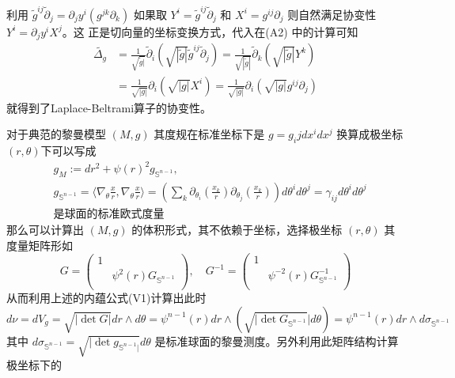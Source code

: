 利用 $\tilde{g}^{ij} \tilde{\partial}_j = \partial_j y^i( g^{jk} {\partial}_k)$ 如果取 
$Y^i = \tilde{g}^{ij} \tilde{\partial}_j $ 和 $X^i = g^{ij}{\partial}_j $ 则自然满足协变性 $Y^i = \partial_j y^i X^j$。这
正是切向量的坐标变换方式，代入在(A2) 中的计算可知
\begin{align*}
    \widetilde{\Delta_g} &= \frac{1}{\sqrt{\tilde{g}|}} \tilde{\partial}_i (\sqrt{|\tilde{g}|}\tilde{g}^{ij}\tilde{\partial}_j ) = \frac{1}{\sqrt{|\tilde{g}|}} \tilde{\partial}_k (\sqrt{|\tilde{g}|}Y^k)\\
    & = \frac{1}{\sqrt{|g|}} \partial_i (\sqrt{|g|}X^i ) =  \frac{1}{\sqrt{|g|}} \partial_i (\sqrt{|g|}g^{ij}\partial_j )
\end{align*}
就得到了Laplace-Beltrami算子的协变性。

对于典范的黎曼模型 $(M,g)$ 其度规在标准坐标下是 $g = g_ij dx^i dx^j$ 换算成极坐标$(r,\theta)$下可以写成
\begin{align*}
    &g_M := dr^2 + \psi(r)^2 g_{\mathbb{S}^{n-1}},\quad\\
    &g_{\mathbb{S}^{n-1}} = \langle \nabla_{\theta}\frac{x}{r},\nabla_{\theta}\frac{x}{r}\rangle
    = (\sum_k\partial_{\theta_i}(\frac{x_k}{r})\partial_{\theta_j}(\frac{x_k}{r}))d\theta^i d\theta^j
    = \gamma_{ij}d\theta^i d\theta^j \\
    &\text{是球面的标准欧式度量}
\end{align*}
那么可以计算出 $(M,g)$ 的体积形式，其不依赖于坐标，选择极坐标 $(r,\theta)$ 其度量矩阵形如
\begin{equation*}
    G = 
    \left(
        \begin{matrix}
            1   & \\
                &\psi^{2}(r)G_{\mathbb{S}^{n-1}}\\
        \end{matrix}
    \right),\quad G^{-1} = 
    \left(
        \begin{matrix}
            1   & \\
                &\psi^{-2}(r)G_{\mathbb{S}^{n-1}}^{-1}\\
        \end{matrix}
    \right)
\end{equation*}
从而利用上述的内蕴公式(V1)计算出此时
\begin{equation*}
    d \nu = dV_g = \sqrt{|\det G|}dr \wedge d\theta = \psi^{n-1}(r)dr \wedge (\sqrt{|\det G_{\mathbb{S}^{n-1}}}|d\theta) = \psi^{n-1}(r)dr \wedge d \sigma_{\mathbb{S}^{n-1}}
\end{equation*}
其中 $d \sigma_{\mathbb{S}^{n-1}} = \sqrt{|\det g_{\mathbb{S}^{n-1}|}}d\theta$ 是标准球面的黎曼测度。另外利用此矩阵结构计算极坐标下的

